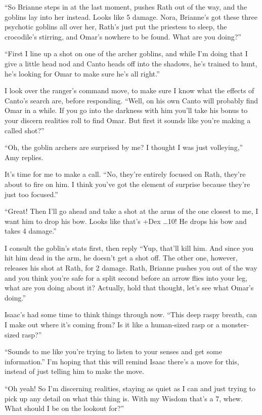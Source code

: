  ``So Brianne steps in at the last moment, pushes Rath out of the way, and the goblins lay into her instead. Looks like 5 damage. Nora, Brianne's got these three psychotic goblins all over her, Rath's just put the priestess to sleep, the crocodile's stirring, and Omar's nowhere to be found. What are you doing?''


 ``First I line up a shot on one of the archer goblins, and while I'm doing that I give a little head nod and Canto heads off into the shadows, he's trained to hunt, he's looking for Omar to make sure he's all right.''


 I look over the ranger's command move, to make sure I know what the effects of Canto's search are, before responding. ``Well, on his own Canto will probably find Omar in a while. If you go into the darkness with him you'll take his bonus to your discern realities roll to find Omar. But first it sounds like you're making a called shot?''


 ``Oh, the goblin archers are surprised by me? I thought I was just volleying,'' Amy replies.


 It's time for me to make a call. ``No, they're entirely focused on Rath, they're about to fire on him. I think you've got the element of surprise because they're just too focused.''


 ``Great! Then I'll go ahead and take a shot at the arms of the one closest to me, I want him to drop his bow. Looks like that's +Dex \ldots  10! He drops his bow and takes 4 damage.''


 I consult the goblin's stats first, then reply ``Yup, that'll kill him. And since you hit him dead in the arm, he doesn't get a shot off. The other one, however, releases his shot at Rath, for 2 damage. Rath, Brianne pushes you out of the way and you think you're safe for a split second before an arrow flies into your leg, what are you doing about it? Actually, hold that thought, let's see what Omar's doing.''


 Isaac's had some time to think things through now. ``This deep raspy breath, can I make out where it's coming from? Is it like a human-sized rasp or a monster-sized rasp?''


 ``Sounds to me like you're trying to listen to your senses and get some information.'' I'm hoping that this will remind Isaac there's a move for this, instead of just telling him to make the move.


 ``Oh yeah! So I'm discerning realities, staying as quiet as I can and just trying to pick up any detail on what this thing is. With my Wisdom that's a 7, whew. What should I be on the lookout for?''


